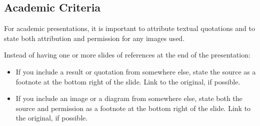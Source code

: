 \subsection{Academic Criteria}

For academic presentations, it is important to attribute textual
quotations and to state both attribution and permission for any
images used.

Instead of having one or more slides of references at the end of the
presentation:
\begin{itemize}
\item If you include a result or quotation from somewhere else, state
  the source as a footnote at the bottom right of the slide.  Link to
  the original, if possible.

\item If you include an image or a diagram from somewhere else, state
  both the source and permission as a footnote at the bottom right of
  the slide. Link to the original, if possible.
\end{itemize}

